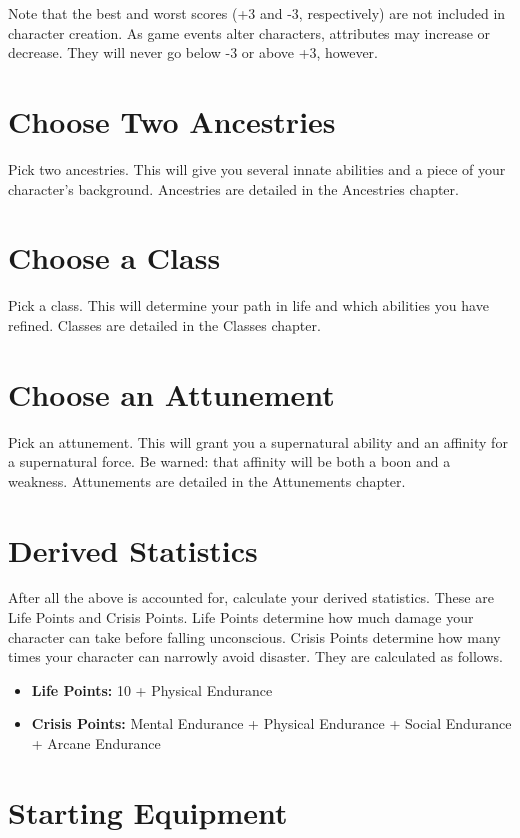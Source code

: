 \begin{multicols}{2}
Note that the best and worst scores (+3 and -3, respectively) are not
included in character creation. As game events alter characters,
attributes may increase or decrease. They will never go below -3 or
above +3, however.

\section{Choose Two Ancestries}

Pick two ancestries. This will give you several innate abilities
and a piece of your character's background. Ancestries are detailed
in the Ancestries chapter.

\section{Choose a Class}

Pick a class. This will determine your path in life and which
abilities you have refined. Classes are detailed in the Classes
chapter.

\section{Choose an Attunement}

Pick an attunement. This will grant you a supernatural ability
and an affinity for a supernatural force. Be warned: that
affinity will be both a boon and a weakness. Attunements are
detailed in the Attunements chapter.

\section{Derived Statistics}

After all the above is accounted for, calculate your derived
statistics. These are Life Points and Crisis Points. Life Points
determine how much damage your character can take before falling
unconscious. Crisis Points determine how many times your character
can narrowly avoid disaster. They are calculated as follows.

\begin{itemize}
  \item \textbf{Life Points:} 10 + Physical Endurance
  \item \textbf{Crisis Points:} Mental Endurance + Physical Endurance + Social Endurance + Arcane Endurance
\end{itemize}

\section{Starting Equipment}


\end{multicols}
